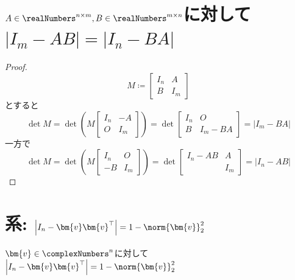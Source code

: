     \section{\texorpdfstring{$A\in\realNumbers^{n\times m}, B\in\realNumbers^{m\times n}$}{A∈R\string^(n×m), B∈R\string^(m×n)}に対して\texorpdfstring{$|I_m-AB| = |I_n-BA|$}{|Im-AB| = |In-BA|}}
        \label{I-ABの行列式}
        \begin{proof}
            \[
                M \coloneq \begin{bmatrix}
                    I_n & A \\
                    B & I_m
                \end{bmatrix}
            \]
            とすると
            \[
                \det{M} = \det{
                    \left(M
                    \begin{bmatrix}
                        I_n & -A \\
                        O & I_m
                    \end{bmatrix}
                    \right)
                } = \det{
                    \begin{bmatrix}
                        I_n & O \\
                        B & I_m-BA
                    \end{bmatrix}
                } = |I_m-BA|
            \]
            一方で
            \[
                \det{M} = \det{
                    \left(M
                    \begin{bmatrix}
                        I_n & O \\
                        -B & I_m
                    \end{bmatrix}
                    \right)
                } = \det{
                    \begin{bmatrix}
                        I_n-AB & A \\
                        ~ & I_m
                    \end{bmatrix}
                } = |I_n-AB|
            \]
        \end{proof}
    \section{系: \texorpdfstring{$\left|I_n-\bm{v}\bm{v}^\top\right| = 1-\norm{\bm{v}}_2^2$}{|In-vv\string^| = 1 - ||v||\string^2}}
        \begin{shadebox}
            $\bm{v} \in \complexNumbers^n$に対して$\left|I_n-\bm{v}\bm{v}^\top\right| = 1-\norm{\bm{v}}_2^2$
        \end{shadebox}
